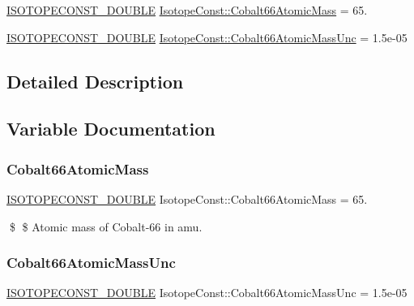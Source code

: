 \begin{DoxyCompactItemize}
\item 
\mbox{\hyperlink{group___isotope_const-_macros_ga8f45a7272ce02c0b4c65c44636ed719a}{I\+S\+O\+T\+O\+P\+E\+C\+O\+N\+S\+T\+\_\+\+D\+O\+U\+B\+LE}} \mbox{\hyperlink{group___isotope_const-_cobalt-_co66_ga2873ff5b104570becc016ce76252bd06}{Isotope\+Const\+::\+Cobalt66\+Atomic\+Mass}} = 65.
\item 
\mbox{\hyperlink{group___isotope_const-_macros_ga8f45a7272ce02c0b4c65c44636ed719a}{I\+S\+O\+T\+O\+P\+E\+C\+O\+N\+S\+T\+\_\+\+D\+O\+U\+B\+LE}} \mbox{\hyperlink{group___isotope_const-_cobalt-_co66_ga384a79272abe5609c4917e80c3b66350}{Isotope\+Const\+::\+Cobalt66\+Atomic\+Mass\+Unc}} = 1.\+5e-\/05
\end{DoxyCompactItemize}


\subsection{Detailed Description}


\subsection{Variable Documentation}
\mbox{\label{group___isotope_const-_cobalt-_co66_ga2873ff5b104570becc016ce76252bd06}} 
\subsubsection{\texorpdfstring{Cobalt66\+Atomic\+Mass}{Cobalt66AtomicMass}}
{\footnotesize\ttfamily \mbox{\hyperlink{group___isotope_const-_macros_ga8f45a7272ce02c0b4c65c44636ed719a}{I\+S\+O\+T\+O\+P\+E\+C\+O\+N\+S\+T\+\_\+\+D\+O\+U\+B\+LE}} Isotope\+Const\+::\+Cobalt66\+Atomic\+Mass = 65.}

\$ \$ Atomic mass of Cobalt-\/66 in amu. \mbox{\label{group___isotope_const-_cobalt-_co66_ga384a79272abe5609c4917e80c3b66350}} 
\subsubsection{\texorpdfstring{Cobalt66\+Atomic\+Mass\+Unc}{Cobalt66AtomicMassUnc}}
{\footnotesize\ttfamily \mbox{\hyperlink{group___isotope_const-_macros_ga8f45a7272ce02c0b4c65c44636ed719a}{I\+S\+O\+T\+O\+P\+E\+C\+O\+N\+S\+T\+\_\+\+D\+O\+U\+B\+LE}} Isotope\+Const\+::\+Cobalt66\+Atomic\+Mass\+Unc = 1.\+5e-\/05}

